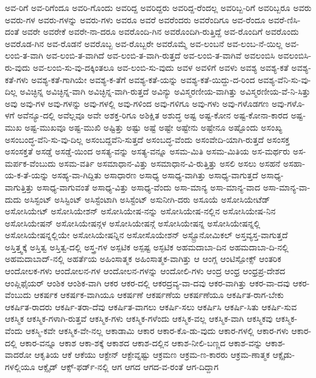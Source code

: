{ಅವ-ರಿಗೆ
ಅವ-ರಿಗೆಂದೂ
ಅವರಿ-ಗೊಂದು
ಅವರಿದ್ದ
ಅವರಿದ್ದರು
ಅವರಿದ್ದ-ರೆಂದಲ್ಲ
ಅವರಿಬ್ಬ-ರಿಗೆ
ಅವರಿಬ್ಬರೂ
ಅವರು
ಅವರು-ಗಳ
ಅವರು-ಗಳನ್ನು
ಅವರು-ಗಳು
ಅವರೂ
ಅವರೆ
ಅವರೆಂದರು
ಅವರೆಂದಿಗೂ
ಅವ-ರೆಂದೂ
ಅವರೆ-ಣಿಸಿ-ದಂತೆ
ಅವರೇ
ಅವರೇಕೆ
ಅವರೇ-ನಾ-ದರೂ
ಅವರೊಂದಿ-ಗಿನ
ಅವರೊಂದಿಗಿ-ರುತ್ತಿದ್ದೆ
ಅವ-ರೊಂದಿಗೆ
ಅವರೊಂದು
ಅವರೊಡ-ಗಿನ
ಅವ-ರೊಡನೆ
ಅವರೊಬ್ಬ
ಅವ-ರೊಬ್ಬರೇ
ಅವರೊಮ್ಮೆ
ಅವ-ಲಂಬನೆ
ಅವ-ಲಂಬ-ನೆ-ಯಿಲ್ಲ
ಅವ-ಲಂಬಿ-ತ-ವಾಗಿ
ಅವ-ಲಂಬಿ-ತ-ವಾಗಿದೆ
ಅವ-ಲಂಬಿ-ತ-ವಾಗಿ-ರುತ್ತದೆ
ಅವ-ಲಂಬಿ-ತ-ವಾಗಿವೆ
ಅವಲಂಬಿಸಿ
ಅವಲಂಬಿಸಿ-ರು-ವುದು
ಅವ-ಲಂಬಿ-ಸು-ವು-ದಕ್ಕಿಂತಲೂ
ಅವ-ಲಂಬಿ-ಸು-ವುದು
ಅವಳ
ಅವಳಿಗೆ
ಅವಳು
ಅವಶ್ಯ
ಅವಶ್ಯ-ಕತೆ
ಅವಶ್ಯ-ಕತೆ-ಗಳು
ಅವಶ್ಯ-ಕತೆ-ಗಾಗಿಯೇ
ಅವಶ್ಯ-ಕ-ತೆಗೆ
ಅವಶ್ಯ-ಕತೆ-ಯನ್ನು
ಅವಶ್ಯ-ಕತೆ-ಯಿದ್ದು-ದ-ರಿಂದ
ಅವಶ್ಯ-ವೆನಿ-ಸು-ವು-ದಿಲ್ಲ
ಅವಿಚ್ಛಿನ್ನ
ಅವಿಚ್ಛಿನ್ನ-ವಾಗಿ
ಅವಿಚ್ಛಿನ್ನ-ವಾಗಿ-ರುತ್ತದೆ
ಅವಿನ್ಯು
ಅವಿಸ್ಮರಣೀಯ-ವಾಗಿತ್ತು
ಅವಿಸ್ಮರಣೀಯ-ವೆ-ನಿ-ಸಿತ್ತು
ಅವು
ಅವು-ಗಳ
ಅವು-ಗಳನ್ನು
ಅವು-ಗಳಲ್ಲಿ
ಅವು-ಗಳಿಂದ
ಅವು-ಗಳಿಗೂ
ಅವು-ಗಳು
ಅವು-ಗಳೊಡಗಣ
ಅವು-ಗಳೊ-ಳಗೆ
ಅವೆನ್ಯೂ-ದಲ್ಲಿ
ಅವೆಲ್ಲವೂ
ಅವೇ
ಅಶಕ್ತ-ರಿಗೂ
ಅಶಿಕ್ಷಿತ
ಅಶುದ್ಧ
ಅಷ್ಟ
ಅಷ್ಟ-ಕೋನ
ಅಷ್ಟ-ಕೋನಾ-ಕಾರದ
ಅಷ್ಟ-ಮುಖ
ಅಷ್ಟ-ಮುಖವೂ
ಅಷ್ಟ-ಮುಖಿ
ಅಷ್ಟಿತ್ತು
ಅಷ್ಟು
ಅಷ್ಟೆ
ಅಷ್ಟೇ
ಅಷ್ಟೇನು
ಅಷ್ಟೇನೂ
ಅಷ್ಟೊಂದು
ಅಸಂಖ್ಯ
ಅಸಂಬಂದ್ಧ-ವೆನಿ-ಸು-ವು-ದಿಲ್ಲ
ಅಸಂಬದ್ದವೆನಿ-ಸುತ್ತದೆ
ಅಸಂಬದ್ಧ-ವೆಂದು
ಅಸಂವೇದಿ-ಯಾಗಿ-ರುತ್ತದೆ
ಅಸಂಸಕ್ತ
ಅಸಂಸಕ್ತತೆ
ಅಸಡ್ಡೆ
ಅಸಡ್ಡೆ-ಯಿಂದ
ಅಸತ್ಯ-ವನ್ನು
ಅಸತ್ಯ-ವನ್ನೂ
ಅಸಮ-ಮಿತಿ
ಅಸಮ-ಮಿತಿಯ
ಅಸ-ಮರ್ಥರು
ಅಸ-ಮರ್ಪಕ-ವೆಂಬುದು
ಅಸಮ-ವರ್ತಿ
ಅಸಮಾಧಾನ-ವಿತ್ತು
ಅಸಮಾಧಾನ-ವಿ-ರುತ್ತಿತ್ತು
ಅಸಲಿ
ಅಸಲು
ಅಸಹನೆ
ಅಸಹಾ-ಯ-ಕ-ತೆ-ಯನ್ನು
ಅಸಹ್ಯ-ವಾ-ಗಿದ್ದಿತು
ಅಸಾಧಾರಣ
ಅಸಾಧ್ಯ
ಅಸಾಧ್ಯ-ವಾಗಿತ್ತು
ಅಸಾಧ್ಯ-ವಾಗುತ್ತದೆ
ಅಸಾಧ್ಯ-ವಾಗುತ್ತಿತ್ತು
ಅಸಾಧ್ಯ-ವಾಗುವಂತೆ
ಅಸಾಧ್ಯ-ವಿತ್ತು
ಅಸಾಧ್ಯ-ವೆಂದು
ಅಸಾ-ಮಾನ್ಯ
ಅಸಾ-ಮಾನ್ಯ-ವಾದ
ಅಸಾ-ಮಾನ್ಯ-ವಾ-ದುದು
ಅಸಿಸ್ಟಂಟ್
ಅಸಿಸ್ಟಿಂಟ್
ಅಸಿಸ್ಟೆಂಟಾಗಿ
ಅಸಿಸ್ಟೆಂಟ್
ಅಸುನೀಗಿ-ದರು
ಅಸೂಯೆ
ಅಸೋಸಿಯೇಟೆಡ್
ಅಸೋಸಿಯೇಟ್
ಅಸೋಸಿಯೇಶನ್
ಅಸೋಸಿಯೇಷ-ನನ್ನು
ಅಸೋಸಿಯೇಷ-ನಲ್ಲಿನ
ಅಸೋಸಿಯೇಷ-ನಿನ
ಅಸೋಸಿಯೇಷನ್
ಅಸೋಸಿಯೇಷನ್ಗಳ
ಅಸೋಸಿಯೇಷನ್ಗೆ
ಅಸೋಸಿಯೇಷನ್ನ
ಅಸೋಸಿಯೇಷನ್ನಲ್ಲಿ
ಅಸೋಸಿಯೇಷನ್ನಲ್ಲಿಯೇ
ಅಸೋಸಿಯೇಷನ್ನಿನ
ಅಸೋಸೊಯೇಶನ್
ಅಸ್ಟ್ರೊನೋಮಿಕಲ್
ಅಸ್ತವ್ಯಸ್ತ-ವಾಗುತ್ತದೆ
ಅಸ್ತಿತ್ತ್ವಕ್ಕೆ
ಅಸ್ತಿತ್ವ
ಅಸ್ತಿತ್ವ-ದಲ್ಲಿ
ಅಸ್ತ್ರ-ಗಳ
ಅಸ್ಪಟಿಕ
ಅಸ್ಪಷ್ಟ
ಅಸ್ಫಟಿಕ
ಅಹಮದಾಬಾ-ದಿನ
ಅಹಮದಾಬಾ-ದಿ-ನಲ್ಲಿ
ಅಹಮದಾಬಾದ್-ನಲ್ಲಿ
ಅಹರ್ತೆಯ
ಅಹಿಂಸಾತ್ಮಕ
ಅಹಿಂಸಾತ್ಮಕ-ವಾಗಿತ್ತು
ಆ
ಆಂಗ್ಲ
ಆಂಟಿಸ್ಪೋಕ್ಸ್
ಆಂತರಿಕ
ಆಂದೋಲಕ-ಗಳು
ಆಂದೋಲನ-ಗಳ
ಆಂದೋಲನ-ಗಳನ್ನು
ಆಂದೋಲಿ-ಗಳು
ಆಂದ್ರ
ಆಂಧ್ರ
ಆಂಧ್ರಪ್ರ-ದೇಶದ
ಆಂಪ್ಲಿಫೈಯರ್
ಆಂಶಿಕ
ಆಂಶಿಕ-ವಾಗಿ
ಆಕರ
ಆಕರ-ದಲ್ಲಿ
ಆಕರದ್ರವ್ಯ-ವಾ-ದವು
ಆಕರ-ವಾಗಿತ್ತು
ಆಕರ-ವಾ-ದವು
ಆಕರ-ವೆಂಬುದು
ಆಕರ್ಷಕ
ಆಕರ್ಷಕ-ವಾಗಿಯೂ
ಆಕರ್ಷಣೆ
ಆಕರ್ಷಣೆಯ
ಆಕರ್ಷಣೆಯೂ
ಆಕರ್ಷಿತ-ರಾಗ-ಬೇಕು
ಆಕರ್ಷಿತ-ರಾದರು
ಆಕರ್ಷಿ-ತರಾ-ದೆವು
ಆಕರ್ಷಿತ-ವಾಗಲು
ಆಕರ್ಷಿ-ಸಲು
ಆಕರ್ಷಿಸಿ
ಆಕರ್ಷಿ-ಸಿತು
ಆಕರ್ಷಿ-ಸುವ
ಆಕಸ್ಮಿಕ
ಆಕಸ್ಮಿಕ-ಗಳಾಗಿ-ರುತ್ತವೆ
ಆಕಸ್ಮಿಕ-ಗಳು
ಆಕಸ್ಮಿಕ-ಗಳೆಂದು
ಆಕಸ್ಮಿಕ-ವಲ್ಲ
ಆಕಸ್ಮಿಕ-ವಾಗಿ
ಆಕಸ್ಮಿಕವು
ಆಕಸ್ಮಿಕ-ವೆಂದು
ಆಕಸ್ಮಿ-ಕವೇ
ಆಕಸ್ಮಿಕ-ವೇ-ನಲ್ಲ
ಆಕಾಡಾಮಿ
ಆಕಾರ
ಆಕಾರ-ಕೊ-ಡು-ವುದು
ಆಕಾರ-ಗಳಲ್ಲಿ
ಆಕಾರ-ಗಳು
ಆಕಾರ-ದಲ್ಲಿ
ಆಕಾರ-ವನ್ನೂ
ಆಕಾಶ
ಆಕಾ-ಶಕ್ಕೆ
ಆಕಾಶದ
ಆಕಾಶ-ದಲ್ಲಿನ
ಆಕಾಶ-ನೀಲಿ-ಬಣ್ಣದ
ಆಕಾಶ-ವನ್ನು
ಆಕಾಶ-ವಾದರೋ
ಆಕೃತಿಯ
ಆಕೆ
ಆಕೆಯು
ಆಕ್ಟೇನ್
ಆಕ್ಟೇವ್ನಷ್ಟು
ಆಕ್ರಮಣ
ಆಕ್ರಮ-ಣ-ಕಾರರು
ಆಕ್ರಮ-ಣಾತ್ಮಕ
ಆಕ್ಸೈಡು-ಗಳಲ್ಲಿಯೂ
ಆಕ್ಸೈಡ್
ಆಕ್ಸ್-ಫರ್ಡ್-ನಲ್ಲಿ
ಆಗ
ಆಗದ
ಆಗದ-ವ-ರಂತೆ
ಆಗ-ದಿದ್ದಾಗ
}

